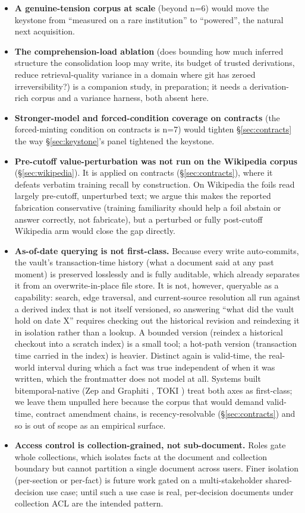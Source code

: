 \documentclass[11pt]{article}
\begin{document}
\begin{itemize}
\item \textbf{A genuine-tension corpus at scale} (beyond n=6) would move the keystone from ``measured
  on a rare institution'' to ``powered'', the natural next acquisition.
\item \textbf{The comprehension-load ablation} (does bounding how much inferred structure the
  consolidation loop may write, its budget of trusted derivations, reduce retrieval-quality
  variance in a domain where git has zeroed irreversibility?) is a companion study, in
  preparation; it needs a derivation-rich corpus and a variance harness, both absent here.
\item \textbf{Stronger-model and forced-condition coverage on contracts} (the forced-minting
  condition on contracts is n=7) would tighten \S\ref{sec:contracts} the way \S\ref{sec:keystone}'s panel tightened the keystone.
\item \textbf{Pre-cutoff value-perturbation was not run on the Wikipedia corpus} (\S\ref{sec:wikipedia}). It is applied on
  contracts (\S\ref{sec:contracts}), where it defeats verbatim training recall by construction. On Wikipedia the
  foils read largely pre-cutoff, unperturbed text; we argue this makes the reported fabrication
  conservative (training familiarity should help a foil abstain or answer correctly, not
  fabricate), but a perturbed or fully post-cutoff Wikipedia arm would close the gap directly.
\item \textbf{As-of-date querying is not first-class.} Because every write auto-commits, the vault's
  transaction-time history (what a document said at any past moment) is preserved losslessly and
  is fully auditable, which already separates it from an overwrite-in-place file store. It is
  not, however, queryable as a capability: search, edge traversal, and current-source resolution
  all run against a derived index that is not itself versioned, so answering ``what did the vault
  hold on date X'' requires checking out the historical revision and reindexing it in isolation
  rather than a lookup. A bounded version (reindex a historical checkout into a scratch index) is
  a small tool; a hot-path version (transaction time carried in the index) is heavier. Distinct
  again is valid-time, the real-world interval during which a fact was true independent of when it
  was written, which the frontmatter does not model at all. Systems built bitemporal-native (Zep
  and Graphiti \citep{rasmussen2025zep}, TOKI \citep{wang2026toki}) treat both axes as first-class; we leave them
  unpulled here because the corpus that would demand valid-time, contract amendment chains, is
  recency-resolvable (\S\ref{sec:contracts}) and so is out of scope as an empirical surface.
\item \textbf{Access control is collection-grained, not sub-document.} Roles gate whole collections, which
  isolates facts at the document and collection boundary but cannot partition a single document
  across users. Finer isolation (per-section or per-fact) is future work gated on a
  multi-stakeholder shared-decision use case; until such a use case is real, per-decision
  documents under collection ACL are the intended pattern.
\end{itemize}
\end{document}
